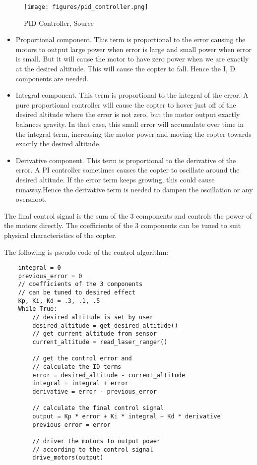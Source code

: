 \documentclass{report}
\begin{document}
\begin{figure}[H]
    \centering
    \texttt{[image: figures/pid\_controller.png]}
    \caption{PID Controller, Source \cite{levidoPIDControl2022}}
    \label{fig:pid_controller}
\end{figure}

\begin{itemize}
    \item Proportional component. This term is proportional to the error causing the motors to output large power when error is large and small power when error is small. But it will cause the motor to have zero power when we are exactly at the desired altitude. This will cause the copter to fall. Hence the I, D components are needed.
    \item Integral component. This term is proportional to the integral of the error. A pure proportional controller will cause the copter to hover just off of the desired altitude where the error is not zero, but the motor output exactly balances gravity. In that case, this small error will accumulate over time in the integral term, increasing the motor power and moving the copter towards exactly the desired altitude.
    \item Derivative component. This term is proportional to the derivative of the error. A PI controller sometimes causes the copter to oscillate around the desired altitude. If the error term keeps growing, this could cause runaway.Hence the derivative term is needed to dampen the oscillation or any overshoot.
\end{itemize}



The final control signal is the sum of the 3 components and controls the power of the motors directly. The coefficients of the 3 components can be tuned to suit physical characteristics of the copter.

The following is pseudo code of the control algorithm:

\begin{verbatim}
    integral = 0
    previous_error = 0
    // coefficients of the 3 components
    // can be tuned to desired effect
    Kp, Ki, Kd = .3, .1, .5
    While True:
        // desired altitude is set by user
        desired_altitude = get_desired_altitude()
        // get current altitude from sensor
        current_altitude = read_laser_ranger()

        // get the control error and
        // calculate the ID terms
        error = desired_altitude - current_altitude
        integral = integral + error
        derivative = error - previous_error

        // calculate the final control signal
        output = Kp * error + Ki * integral + Kd * derivative
        previous_error = error

        // driver the motors to output power
        // according to the control signal
        drive_motors(output)
\end{verbatim}
\end{document}
